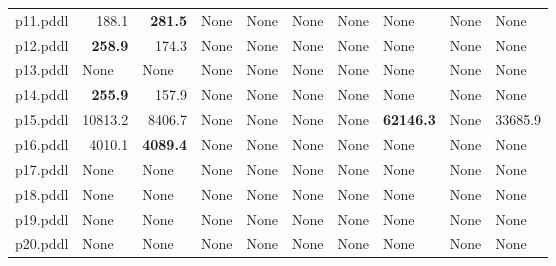 \documentclass{article}
\begin{document}
\begin{tabular}{@{}lrrrrrrrrr@{}}
p11.pddl & 188.1 & \textbf{281.5} & \multicolumn{1}{|l|}{None} & \multicolumn{1}{|l|}{None} & \multicolumn{1}{|l|}{None} & \multicolumn{1}{|l|}{None} & \multicolumn{1}{|l|}{None} & \multicolumn{1}{|l|}{None} & \multicolumn{1}{|l|}{None} \\
p12.pddl & \textbf{258.9} & 174.3 & \multicolumn{1}{|l|}{None} & \multicolumn{1}{|l|}{None} & \multicolumn{1}{|l|}{None} & \multicolumn{1}{|l|}{None} & \multicolumn{1}{|l|}{None} & \multicolumn{1}{|l|}{None} & \multicolumn{1}{|l|}{None} \\
p13.pddl & \multicolumn{1}{|l|}{None} & \multicolumn{1}{|l|}{None} & \multicolumn{1}{|l|}{None} & \multicolumn{1}{|l|}{None} & \multicolumn{1}{|l|}{None} & \multicolumn{1}{|l|}{None} & \multicolumn{1}{|l|}{None} & \multicolumn{1}{|l|}{None} & \multicolumn{1}{|l|}{None} \\
p14.pddl & \textbf{255.9} & 157.9 & \multicolumn{1}{|l|}{None} & \multicolumn{1}{|l|}{None} & \multicolumn{1}{|l|}{None} & \multicolumn{1}{|l|}{None} & \multicolumn{1}{|l|}{None} & \multicolumn{1}{|l|}{None} & \multicolumn{1}{|l|}{None} \\
p15.pddl & 10813.2 & 8406.7 & \multicolumn{1}{|l|}{None} & \multicolumn{1}{|l|}{None} & \multicolumn{1}{|l|}{None} & \multicolumn{1}{|l|}{None} & \textbf{62146.3} & \multicolumn{1}{|l|}{None} & 33685.9 \\
p16.pddl & 4010.1 & \textbf{4089.4} & \multicolumn{1}{|l|}{None} & \multicolumn{1}{|l|}{None} & \multicolumn{1}{|l|}{None} & \multicolumn{1}{|l|}{None} & \multicolumn{1}{|l|}{None} & \multicolumn{1}{|l|}{None} & \multicolumn{1}{|l|}{None} \\
p17.pddl & \multicolumn{1}{|l|}{None} & \multicolumn{1}{|l|}{None} & \multicolumn{1}{|l|}{None} & \multicolumn{1}{|l|}{None} & \multicolumn{1}{|l|}{None} & \multicolumn{1}{|l|}{None} & \multicolumn{1}{|l|}{None} & \multicolumn{1}{|l|}{None} & \multicolumn{1}{|l|}{None} \\
p18.pddl & \multicolumn{1}{|l|}{None} & \multicolumn{1}{|l|}{None} & \multicolumn{1}{|l|}{None} & \multicolumn{1}{|l|}{None} & \multicolumn{1}{|l|}{None} & \multicolumn{1}{|l|}{None} & \multicolumn{1}{|l|}{None} & \multicolumn{1}{|l|}{None} & \multicolumn{1}{|l|}{None} \\
p19.pddl & \multicolumn{1}{|l|}{None} & \multicolumn{1}{|l|}{None} & \multicolumn{1}{|l|}{None} & \multicolumn{1}{|l|}{None} & \multicolumn{1}{|l|}{None} & \multicolumn{1}{|l|}{None} & \multicolumn{1}{|l|}{None} & \multicolumn{1}{|l|}{None} & \multicolumn{1}{|l|}{None} \\
p20.pddl & \multicolumn{1}{|l|}{None} & \multicolumn{1}{|l|}{None} & \multicolumn{1}{|l|}{None} & \multicolumn{1}{|l|}{None} & \multicolumn{1}{|l|}{None} & \multicolumn{1}{|l|}{None} & \multicolumn{1}{|l|}{None} & \multicolumn{1}{|l|}{None} & \multicolumn{1}{|l|}{None} \\
\end{tabular}
\end{document}
